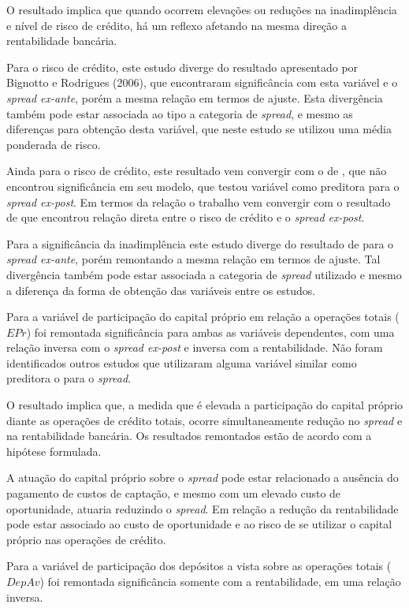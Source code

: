 \documentclass[
  12pt,
  12pt,
  openright,
  oneside,
  a4paper,
  chapter=TITLE,
  section=TITLE,
  subsection=TITLE,
  subsubsection=TITLE,
  portugues,
  sumario=tradicional]{abntex2}
\begin{document}
O resultado implica que quando ocorrem elevações ou reduções na inadimplência e nível de risco de crédito, há um reflexo afetando na mesma direção a rentabilidade bancária.

Para o risco de crédito, este estudo diverge do resultado apresentado por Bignotto e Rodrigues (2006), que encontraram significância com esta variável e o \emph{spread ex-ante}, porém a mesma relação em termos de ajuste. Esta divergência também pode estar associada ao tipo a categoria de \emph{spread}, e mesmo as diferenças para obtenção desta variável, que neste estudo se utilizou uma média ponderada de risco.

Ainda para o risco de crédito, este resultado vem convergir com o de \textcite{almeida:2013}, que não encontrou significância em seu modelo, que testou variável como preditora para o \emph{spread ex-post}. Em termos da relação o trabalho vem convergir com o resultado de \textcite{dantas:2012} que encontrou relação direta entre o risco de crédito e o \emph{spread ex-post}.

Para a significância da inadimplência este estudo diverge do resultado de \textcite{durigan:2018} para o \emph{spread ex-ante}, porém remontando a mesma relação em termos de ajuste. Tal divergência também pode estar associada a categoria de \emph{spread} utilizado e mesmo a diferença da forma de obtenção das variáveis entre os estudos.

Para a variável de participação do capital próprio em relação a operações totais (\(EPr\)) foi remontada significância para ambas as variáveis dependentes, com uma relação inversa com o \emph{spread ex-post} e inversa com a rentabilidade. Não foram identificados outros estudos que utilizaram alguma variável similar como preditora o para o \emph{spread}.

O resultado implica que, a medida que é elevada a participação do capital próprio diante as operações de crédito totais, ocorre simultaneamente redução no \emph{spread} e na rentabilidade bancária. Os resultados remontados estão de acordo com a hipótese formulada.

A atuação do capital próprio sobre o \emph{spread} pode estar relacionado a ausência do pagamento de custos de captação, e mesmo com um elevado custo de oportunidade, atuaria reduzindo o \emph{spread}. Em relação a redução da rentabilidade pode estar associado ao custo de oportunidade e ao risco de se utilizar o capital próprio nas operações de crédito.

Para a variável de participação dos depósitos a vista sobre as operações totais (\(DepAv\)) foi remontada significância somente com a rentabilidade, em uma relação inversa.
\end{document}
